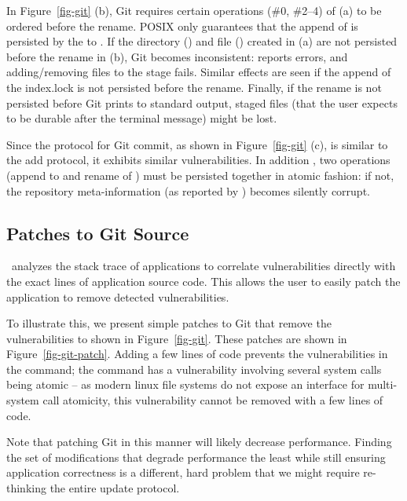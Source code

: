 In Figure~\ref{fig-git} (b), Git requires certain operations (\#0, \#2--4) 
of (a) to be ordered before the rename. POSIX only guarantees that
the append of  is persisted by the  to
. If the directory () and file ()
created in (a) are not persisted before the rename in (b), Git becomes
inconsistent:  reports errors, and adding/removing files to
the stage fails. Similar effects are seen if the append of the index.lock is
not persisted before the rename. Finally, if the rename is not persisted before
Git prints to standard output, staged files (that the user expects to be
durable after the terminal message) might be lost.

Since the protocol for Git commit, as shown in Figure~\ref{fig-git} (c), is
similar to the add protocol, it exhibits similar vulnerabilities. In addition ,
two operations (append to  and rename of )
must be persisted together in atomic fashion: if not, the repository
meta-information (as reported by ) becomes silently
corrupt. 

\subsection{Patches to Git Source}
\label{sec-git-patch}


\toolname\ analyzes the stack trace of applications to correlate
vulnerabilities directly with the exact lines of application source code. This
allows the user to easily patch the application to remove detected
vulnerabilities.

To illustrate this, we present simple patches to Git that remove the
vulnerabilities to  shown in Figure~\ref{fig-git}. These
patches are shown in Figure~\ref{fig-git-patch}. Adding a few lines of code
prevents the vulnerabilities in the  command; the  command has a vulnerability involving several system calls being atomic
-- as modern linux file systems do not expose an interface for multi-system
call atomicity, this vulnerability cannot be removed with a few lines of code.

Note that patching Git in this manner will likely decrease performance. Finding
the set of modifications that degrade performance the least while still
ensuring application correctness is a different, hard problem that we might
require re-thinking the entire update protocol. 
